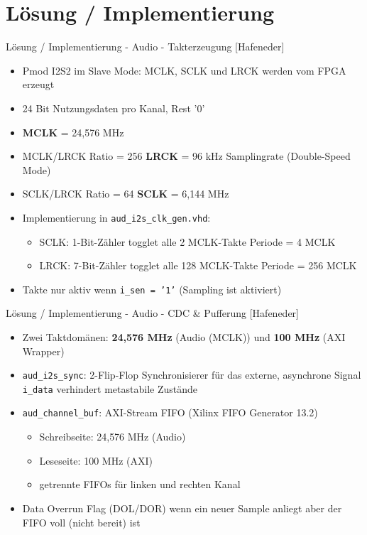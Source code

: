 \section{Lösung / Implementierung}
\begin{frame}{Lösung / Implementierung - Audio - Takterzeugung [Hafeneder]}
    \begin{itemize}
        \item Pmod I2S2 im Slave Mode: MCLK, SCLK und LRCK werden vom FPGA erzeugt
        \item 24 Bit Nutzungsdaten pro Kanal, Rest '0'
        \item \textbf{MCLK} = 24{,}576 MHz
        \item MCLK/LRCK Ratio = 256 \ra  \textbf{LRCK} = 96 kHz Samplingrate (Double-Speed Mode)
        \item SCLK/LRCK Ratio = 64 \ra  \textbf{SCLK} = 6{,}144 MHz
        \item Implementierung in \texttt{aud\_i2s\_clk\_gen.vhd}:
        \begin{itemize}
            \item SCLK: 1-Bit-Zähler togglet alle 2 MCLK-Takte \ra Periode = 4 MCLK
            \item LRCK: 7-Bit-Zähler togglet alle 128 MCLK-Takte \ra Periode = 256 MCLK
        \end{itemize}
        \item Takte nur aktiv wenn \texttt{i\_sen = '1'} (Sampling ist aktiviert)
    \end{itemize}
\end{frame}
\begin{frame}{Lösung / Implementierung - Audio - CDC \& Pufferung [Hafeneder]}
    \begin{itemize}
        \item Zwei Taktdomänen: \textbf{24{,}576 MHz} (Audio (MCLK)) und \textbf{100 MHz} (AXI Wrapper)
        \item \texttt{aud\_i2s\_sync}: 2-Flip-Flop Synchronisierer für das externe, asynchrone Signal \texttt{i\_data} \ra verhindert metastabile Zustände
        \item \texttt{aud\_channel\_buf}: AXI-Stream FIFO (Xilinx FIFO Generator 13.2)
        \begin{itemize}
            \item Schreibseite: 24{,}576 MHz (Audio)
            \item Leseseite: 100 MHz (AXI)
            \item getrennte FIFOs für linken und rechten Kanal
        \end{itemize}
        \item Data Overrun Flag (DOL/DOR) wenn ein neuer Sample anliegt aber der FIFO voll (nicht bereit) ist
    \end{itemize}
\end{frame}